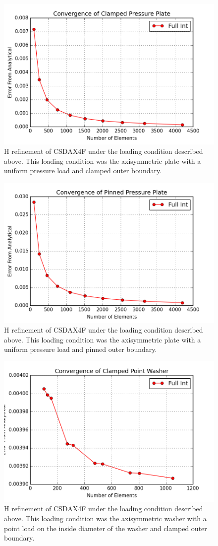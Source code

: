 \documentclass[10pt,letterpaper]{report}
\numberwithin{equation}{chapter}
\begin{document}
\begin{figure}[H]
\centering
\includegraphics[width=0.7\linewidth]{./GoodImages/Conv_PlPrCl_2}
\caption[H refinement of CSDAX4F]{H refinement of CSDAX4F under the loading condition described above. This loading condition was the axisymmetric plate with a uniform pressure load and clamped outer boundary.}
\label{fig:Conv_PlPoCl_2}
\end{figure}

\begin{figure}[H]
\centering
\includegraphics[width=0.7\linewidth]{./GoodImages/Conv_PlPrPi_2}
\caption[H refinement of CSDAX4F]{H refinement of CSDAX4F under the loading condition described above. This loading condition was the axisymmetric plate with a uniform pressure load and pinned outer boundary.}
\label{fig:Conv_PlPoCl_2}
\end{figure}

\begin{figure}[H]
\centering
\includegraphics[width=0.7\linewidth]{./GoodImages/Conv_WaPoCl_2}
\caption[H refinement of CSDAX4F]{H refinement of CSDAX4F under the loading condition described above. This loading condition was the axisymmetric washer with a point load on the inside diameter of the washer and clamped outer boundary.}
\label{fig:Conv_PlPoCl_2}
\end{figure}
\end{document}
